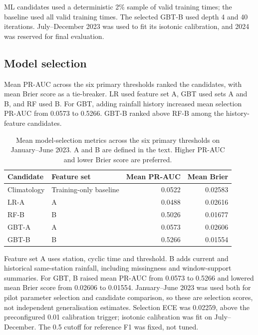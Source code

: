 \documentclass[11pt,a4paper]{article}
\begin{document}
ML candidates used a deterministic 2\% sample of valid training times; the
baseline used all valid training times. The selected GBT-B used depth 4 and 40
iterations. July--December 2023 was used to fit its isotonic calibration, and
2024 was reserved for final evaluation.

\subsection{Model selection}
Mean PR-AUC across the six primary thresholds ranked the candidates, with mean
Brier score as a tie-breaker. LR used feature set A, GBT used sets A and B, and
RF used B. For GBT, adding rainfall history increased mean selection PR-AUC
from 0.0573 to 0.5266. GBT-B ranked above RF-B among the history-feature
candidates.

\begin{table}[htbp]
\centering\small
\caption{Mean model-selection metrics across the six primary thresholds on
January--June 2023. A and B are defined in the text. Higher PR-AUC and lower
Brier score are preferred.}
\label{tab:selection}
\begin{tabularx}{\linewidth}{l X r r}
\toprule
Candidate & Feature set & Mean PR-AUC & Mean Brier \\
\midrule
Climatology & Training-only baseline & 0.0522 & 0.02583 \\
LR-A & A & 0.0488 & 0.02616 \\
RF-B & B & 0.5026 & 0.01677 \\
GBT-A & A & 0.0573 & 0.02606 \\
GBT-B & B & 0.5266 & 0.01554 \\
\bottomrule
\end{tabularx}
\end{table}

Feature set A uses station, cyclic time and threshold. B adds current and
historical same-station rainfall, including missingness and window-support
summaries. For GBT, B raised mean PR-AUC from 0.0573 to 0.5266 and lowered mean
Brier score from 0.02606 to 0.01554. January--June 2023 was used both for pilot
parameter selection and candidate comparison, so these are selection scores,
not independent generalisation estimates. Selection ECE was 0.02259, above the
preconfigured 0.01 calibration trigger; isotonic calibration was fit on
July--December. The 0.5 cutoff for reference F1 was fixed, not tuned.
\end{document}
